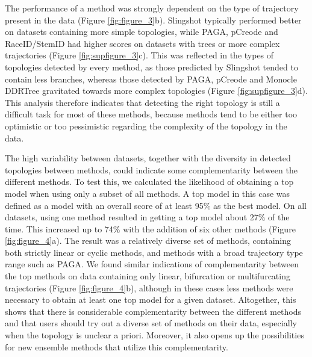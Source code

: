 The performance of a method was strongly dependent on the type of trajectory present in the data (Figure \ref{fig:figure_3}b). Slingshot typically performed better on datasets containing more simple topologies, while PAGA, pCreode and RaceID/StemID had higher scores on datasets with trees or more complex trajectories (Figure \ref{fig:supfigure_3}c). This was reflected in the types of topologies detected by every method, as those predicted by Slingshot tended to contain less branches, whereas those detected by PAGA, pCreode and Monocle DDRTree gravitated towards more complex topologies (Figure \ref{fig:supfigure_3}d). This analysis therefore indicates that detecting the right topology is still a difficult task for most of these methods, because methods tend to be either too optimistic or too pessimistic regarding the complexity of the topology in the data.

The high variability between datasets, together with the diversity in detected topologies between methods, could indicate some complementarity between the different methods. To test this, we calculated the likelihood of obtaining a top model when using only a subset of all methods. A top model in this case was defined as a model with an overall score of at least 95$\%$ as the best model. On all datasets, using one method resulted in getting a top model about 27$\%$ of the time. This increased up to 74$\%$ with the addition of six other methods (Figure \ref{fig:figure_4}a). The result was a relatively diverse set of methods, containing both strictly linear or cyclic methods, and methods with a broad trajectory type range such as PAGA. We found similar indications of complementarity between the top methods on data containing only linear, bifurcation or multifurcating trajectories (Figure \ref{fig:figure_4}b), although in these cases less methods were necessary to obtain at least one top model for a given dataset. Altogether, this shows that there is considerable complementarity between the different methods and that users should try out a diverse set of methods on their data, especially when the topology is unclear a priori. Moreover, it also opens up the possibilities for new ensemble methods that utilize this complementarity.

